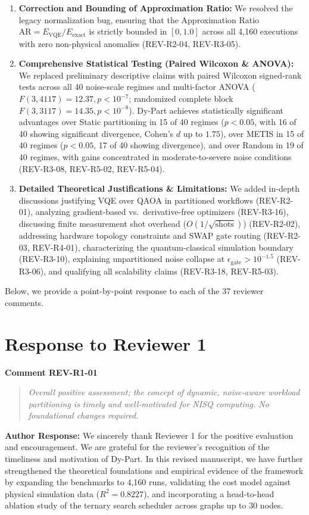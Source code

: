 \documentclass[11pt,a4paper]{article}
\newcommand{\commentbox}[2]{
    \vspace{0.8em}
    \noindent\textbf{\textcolor{commentcolor}{#1}}
    \vspace{0.2em}
    \begin{quote}
        \small\itshape #2
    \end{quote}
}
\newcommand{\responsebox}[1]{
    \noindent\textbf{\textcolor{responsecolor}{Author Response:}} #1
    \vspace{0.8em}
}
\begin{document}
\begin{enumerate}[leftmargin=*]
    \item \textbf{Correction and Bounding of Approximation Ratio:} We resolved the legacy normalization bug, ensuring that the Approximation Ratio $\text{AR} = E_{\text{VQE}} / E_{\text{exact}}$ is strictly bounded in $[0, 1.0]$ across all 4,160 executions with zero non-physical anomalies (REV-R2-04, REV-R3-05).
    \item \textbf{Comprehensive Statistical Testing (Paired Wilcoxon \& ANOVA):} We replaced preliminary descriptive claims with paired Wilcoxon signed-rank tests across all 40 noise-scale regimes and multi-factor ANOVA ($F(3, 4117) = 12.37, p < 10^{-7}$; randomized complete block $F(3, 3117) = 14.35, p < 10^{-8}$). Dy-Part achieves statistically significant advantages over Static partitioning in 15 of 40 regimes ($p < 0.05$, with 16 of 40 showing significant divergence, Cohen's $d$ up to $1.75$), over METIS in 15 of 40 regimes ($p < 0.05$, 17 of 40 showing divergence), and over Random in 19 of 40 regimes, with gains concentrated in moderate-to-severe noise conditions (REV-R3-08, REV-R5-02, REV-R5-04).
    \item \textbf{Detailed Theoretical Justifications \& Limitations:} We added in-depth discussions justifying VQE over QAOA in partitioned workflows (REV-R2-01), analyzing gradient-based vs.\ derivative-free optimizers (REV-R3-16), discussing finite measurement shot overhead ($O(1/\sqrt{\text{shots}})$) (REV-R2-02), addressing hardware topology constraints and SWAP gate routing (REV-R2-03, REV-R4-01), characterizing the quantum-classical simulation boundary (REV-R3-10), explaining unpartitioned noise collapse at $\epsilon_{\text{gate}} > 10^{-1.5}$ (REV-R3-06), and qualifying all scalability claims (REV-R3-18, REV-R5-03).
\end{enumerate}

Below, we provide a point-by-point response to each of the 37 reviewer comments.

\newpage

\section*{Response to Reviewer 1}

\commentbox{Comment REV-R1-01}{Overall positive assessment; the concept of dynamic, noise-aware workload partitioning is timely and well-motivated for NISQ computing. No foundational changes required.}

\responsebox{We sincerely thank Reviewer 1 for the positive evaluation and encouragement. We are grateful for the reviewer's recognition of the timeliness and motivation of Dy-Part. In this revised manuscript, we have further strengthened the theoretical foundations and empirical evidence of the framework by expanding the benchmarks to 4,160 runs, validating the cost model against physical simulation data ($R^2 = 0.8227$), and incorporating a head-to-head ablation study of the ternary search scheduler across graphs up to 30 nodes.}
\end{document}
